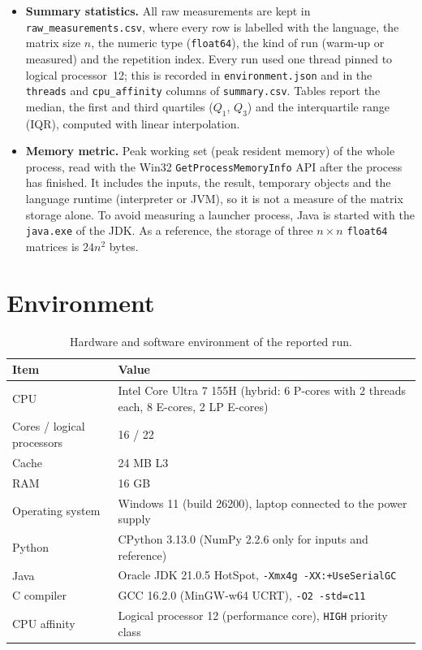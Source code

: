 \documentclass[12pt,a4paper]{report}
\begin{document}
\begin{itemize}
  that exceeds a limit is stopped and recorded as a timeout or memory failure, and the larger sizes of that language
  are not attempted. No time is invented for failed configurations.
  \item \textbf{Summary statistics.} All raw measurements are kept in \texttt{raw\_measurements.csv}, where every row is
  labelled with the language, the matrix size $n$, the numeric type (\texttt{float64}), the kind of run (warm-up or
  measured) and the repetition index. Every run used one thread pinned to logical processor~12; this is recorded in
  \texttt{environment.json} and in the \texttt{threads} and \texttt{cpu\_affinity} columns of \texttt{summary.csv}.
  Tables report the median, the first and third quartiles ($Q_1$, $Q_3$) and the interquartile range (IQR), computed
  with linear interpolation.
  \item \textbf{Memory metric.} Peak working set (peak resident memory) of the whole process, read with the Win32
  \texttt{GetProcessMemoryInfo} API after the process has finished. It includes the inputs, the result, temporary
  objects and the language runtime (interpreter or JVM), so it is not a measure of the matrix storage alone. To avoid
  measuring a launcher process, Java is started with the \texttt{java.exe} of the JDK. As a reference, the storage of
  three $n \times n$ \texttt{float64} matrices is $24n^2$ bytes.
\end{itemize}

\section{Environment}

\begin{table}[H]
\centering
\small
\caption{Hardware and software environment of the reported run.}
\label{tab:env}
\begin{tabular}{lp{10.5cm}}
\toprule
\textbf{Item} & \textbf{Value} \\
\midrule
CPU & Intel Core Ultra 7 155H (hybrid: 6 P-cores with 2 threads each, 8 E-cores, 2 LP E-cores) \\
Cores / logical processors & 16 / 22 \\
Cache & 24 MB L3 \\
RAM & 16 GB \\
Operating system & Windows 11 (build 26200), laptop connected to the power supply \\
Python & CPython 3.13.0 (NumPy 2.2.6 only for inputs and reference) \\
Java & Oracle JDK 21.0.5 HotSpot, \texttt{-Xmx4g -XX:+UseSerialGC} \\
C compiler & GCC 16.2.0 (MinGW-w64 UCRT), \texttt{-O2 -std=c11} \\
CPU affinity & Logical processor 12 (performance core), \texttt{HIGH} priority class \\
\bottomrule
\end{tabular}
\end{table}
\end{document}
